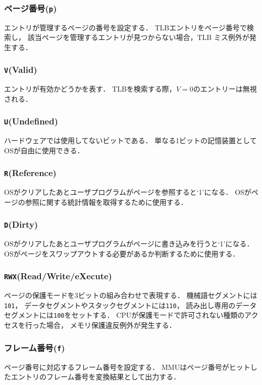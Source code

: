 \subsubsection{ページ番号(\texttt{p})} 
エントリが管理するページの番号を設定する．
TLBエントリをページ番号で検索し，
該当ページを管理するエントリが見つからない場合，TLB ミス例外が発生する．

\subsubsection{\texttt{V}(Valid)}
エントリが有効かどうかを表す．
TLBを検索する際，$V=0$のエントリーは無視される．

\subsubsection{\texttt{U}(Undefined)}
ハードウェアでは使用してないビットである．
単なる1ビットの記憶装置としてOSが自由に使用できる．

\subsubsection{\texttt{R}(Reference)}
OSがクリアしたあとユーザプログラムがページを参照すると`1'になる．
OSがページの参照に関する統計情報を取得するために使用する．

\subsubsection{\texttt{D}(Dirty)}
OSがクリアしたあとユーザプログラムがページに書き込みを行うと`1'になる．
OSがページをスワップアウトする必要があるか判断するために使用する．

\subsubsection{\texttt{RWX}(Read/Write/eXecute)}
ページの保護モードを3ビットの組み合わせで表現する．
機械語セグメントには\texttt{101}，
データセグメントやスタックセグメントには\texttt{110}，
読み出し専用のデータセグメントには\texttt{100}をセットする．
CPUが保護モードで許可されない種類のアクセスを行った場合，
メモリ保護違反例外が発生する．

\subsubsection{フレーム番号(\texttt{f})}
ページ番号に対応するフレーム番号を設定する．
MMUはページ番号がヒットしたエントリのフレーム番号を変換結果として出力する．

